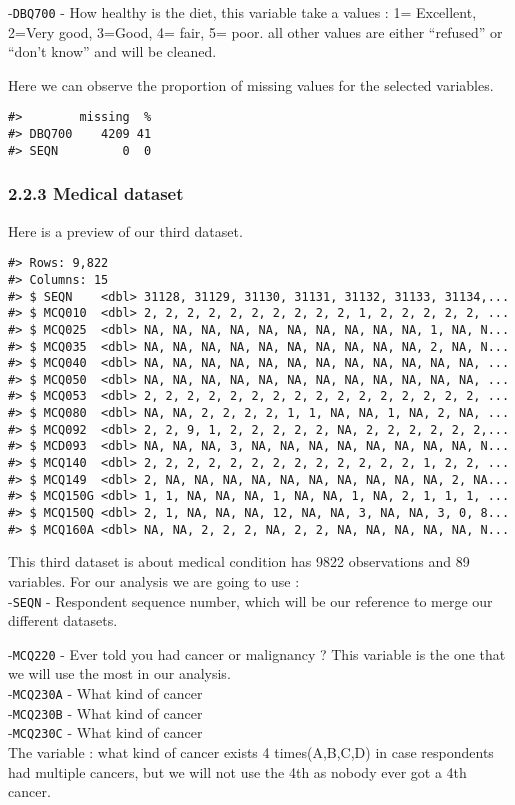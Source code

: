 \documentclass[
]{article}
\begin{document}
-\texttt{DBQ700} - How healthy is the diet, this variable take a values
: 1= Excellent, 2=Very good, 3=Good, 4= fair, 5= poor. all other values
are either ``refused'' or ``don't know'' and will be cleaned.

Here we can observe the proportion of missing values for the selected
variables.

\begin{verbatim}
#>        missing  %
#> DBQ700    4209 41
#> SEQN         0  0
\end{verbatim}

\hypertarget{medical-dataset}{%
\subsubsection{2.2.3 Medical dataset}\label{medical-dataset}}

Here is a preview of our third dataset.

\begin{verbatim}
#> Rows: 9,822
#> Columns: 15
#> $ SEQN    <dbl> 31128, 31129, 31130, 31131, 31132, 31133, 31134,...
#> $ MCQ010  <dbl> 2, 2, 2, 2, 2, 2, 2, 2, 2, 2, 1, 2, 2, 2, 2, 2, ...
#> $ MCQ025  <dbl> NA, NA, NA, NA, NA, NA, NA, NA, NA, NA, 1, NA, N...
#> $ MCQ035  <dbl> NA, NA, NA, NA, NA, NA, NA, NA, NA, NA, 2, NA, N...
#> $ MCQ040  <dbl> NA, NA, NA, NA, NA, NA, NA, NA, NA, NA, NA, NA, ...
#> $ MCQ050  <dbl> NA, NA, NA, NA, NA, NA, NA, NA, NA, NA, NA, NA, ...
#> $ MCQ053  <dbl> 2, 2, 2, 2, 2, 2, 2, 2, 2, 2, 2, 2, 2, 2, 2, 2, ...
#> $ MCQ080  <dbl> NA, NA, 2, 2, 2, 2, 1, 1, NA, NA, 1, NA, 2, NA, ...
#> $ MCQ092  <dbl> 2, 2, 9, 1, 2, 2, 2, 2, 2, NA, 2, 2, 2, 2, 2, 2,...
#> $ MCD093  <dbl> NA, NA, NA, 3, NA, NA, NA, NA, NA, NA, NA, NA, N...
#> $ MCQ140  <dbl> 2, 2, 2, 2, 2, 2, 2, 2, 2, 2, 2, 2, 2, 1, 2, 2, ...
#> $ MCQ149  <dbl> 2, NA, NA, NA, NA, NA, NA, NA, NA, NA, NA, 2, NA...
#> $ MCQ150G <dbl> 1, 1, NA, NA, NA, 1, NA, NA, 1, NA, 2, 1, 1, 1, ...
#> $ MCQ150Q <dbl> 2, 1, NA, NA, NA, 12, NA, NA, 3, NA, NA, 3, 0, 8...
#> $ MCQ160A <dbl> NA, NA, 2, 2, 2, NA, 2, 2, NA, NA, NA, NA, NA, N...
\end{verbatim}

This third dataset is about medical condition has 9822 observations and
89 variables. For our analysis we are going to use :\\
-\texttt{SEQN} - Respondent sequence number, which will be our reference
to merge our different datasets.

-\texttt{MCQ220} - Ever told you had cancer or malignancy ? This
variable is the one that we will use the most in our analysis.\\
-\texttt{MCQ230A} - What kind of cancer\\
-\texttt{MCQ230B} - What kind of cancer\\
-\texttt{MCQ230C} - What kind of cancer\\
The variable : what kind of cancer exists 4 times(A,B,C,D) in case
respondents had multiple cancers, but we will not use the 4th as nobody
ever got a 4th cancer.
\end{document}
